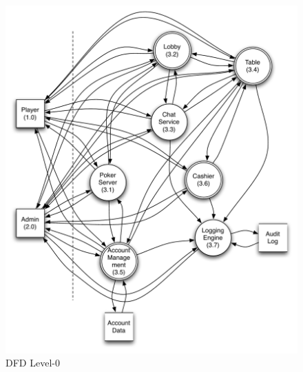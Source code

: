 \documentclass[a4paper,11pt]{report}
\begin{document}
\begin{figure}
  \begin{center}
    \includegraphics[scale=0.8]{dfd_level_0}
  \end{center}
  \caption{DFD Level-0}\label{fig:level_0}
\end{figure}
\end{document}
